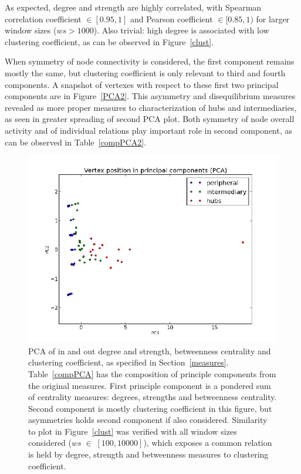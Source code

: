 \documentclass[%
 aip,
 jmp,%
 amsmath,amssymb,
 reprint,%
]{revtex4-1}
\begin{document}
As expected, degree and strength are highly correlated, with Spearman correlation coefficient $\in [0.95,1]$ and Pearson coefficient $\in [0.85,1)$ for larger window sizes ($ws>1000$). Also trivial: high degree is associated with low clustering coefficient, as can be observed in Figure~\ref{clust}.


When symmetry of node connectivity is considered, the first component remains mostly the same, but clustering coefficient is only relevant to third and fourth components. A snapshot of vertexes with respect to these first two principal components are in Figure~\ref{PCA2}. This asymmetry and disequilibrium measures revealed as more proper measures to characterization of hubs and intermediaries, as seen in greater spreading of second PCA plot. Both symmetry of node overall activity and of individual relations play important role in second component, as can be observed in Table~\ref{compPCA2}.


\begin{figure} 
   \centering
        \includegraphics[width=\columnwidth]{figs/ev0pr3PCA}
    \caption{PCA of in and out degree and strength, betweenness centrality and clustering coefficient, as specified in Section~\ref{measures}. Table~\ref{compPCA} has the composition of principle components from the original measures. First principle component is a pondered sum of centrality measures: degrees, strengths and betweenness centrality. Second component is mostly clustering coefficient in this figure, but asymmetries holds second component if also considered. Similarity to plot in Figure~\ref{clust} was verified with all window sizes considered ($ws\;\in\;[100,10000]$), which exposes a common relation is held by degree, strength and betweenness measures to clustering coefficient.}
    \label{PCA}
\end{figure}
\end{document}
